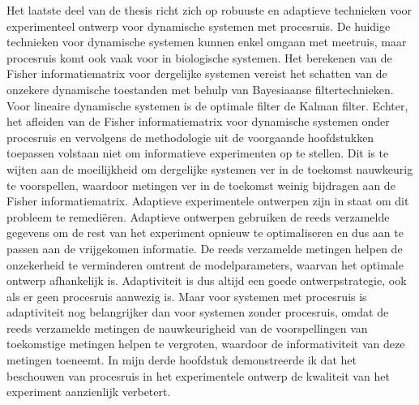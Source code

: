 {\color{red}Het laatste deel van de thesis richt} zich op robuuste en adaptieve technieken voor experimenteel ontwerp voor dynamische systemen met procesruis. De huidige technieken voor dynamische systemen kunnen enkel omgaan met meetruis, maar procesruis komt ook vaak voor in biologische systemen. Het berekenen van de Fisher informatiematrix voor dergelijke systemen vereist het schatten van de onzekere dynamische toestanden met behulp van Bayesiaanse filtertechnieken. Voor lineaire dynamische systemen is de optimale filter de Kalman filter. Echter, het afleiden van de Fisher informatiematrix voor dynamische systemen onder procesruis en vervolgens de methodologie uit de voorgaande hoofdstukken toepassen volstaan niet om informatieve experimenten op te stellen. Dit is te wijten aan de moeilijkheid om dergelijke systemen ver in de toekomst nauwkeurig te voorspellen, waardoor metingen ver in de toekomst weinig bijdragen aan de Fisher informatiematrix. Adaptieve experimentele ontwerpen zijn in staat om dit probleem te remediëren. Adaptieve ontwerpen gebruiken de reeds verzamelde gegevens om de rest van het experiment opnieuw te optimaliseren en dus aan te passen aan de vrijgekomen informatie. De reeds verzamelde metingen helpen de onzekerheid te verminderen omtrent de modelparameters, waarvan het optimale ontwerp afhankelijk is. Adaptiviteit is dus altijd een goede ontwerpstrategie, ook als er geen procesruis aanwezig is. Maar voor systemen met procesruis is adaptiviteit nog belangrijker dan voor systemen zonder procesruis, omdat de reeds verzamelde metingen de nauwkeurigheid van de voorspellingen van toekomstige metingen helpen te vergroten, waardoor de informativiteit van deze metingen toeneemt. In mijn derde hoofdstuk demonstreerde ik dat het beschouwen van procesruis in het experimentele ontwerp de kwaliteit van het experiment aanzienlijk verbetert.
